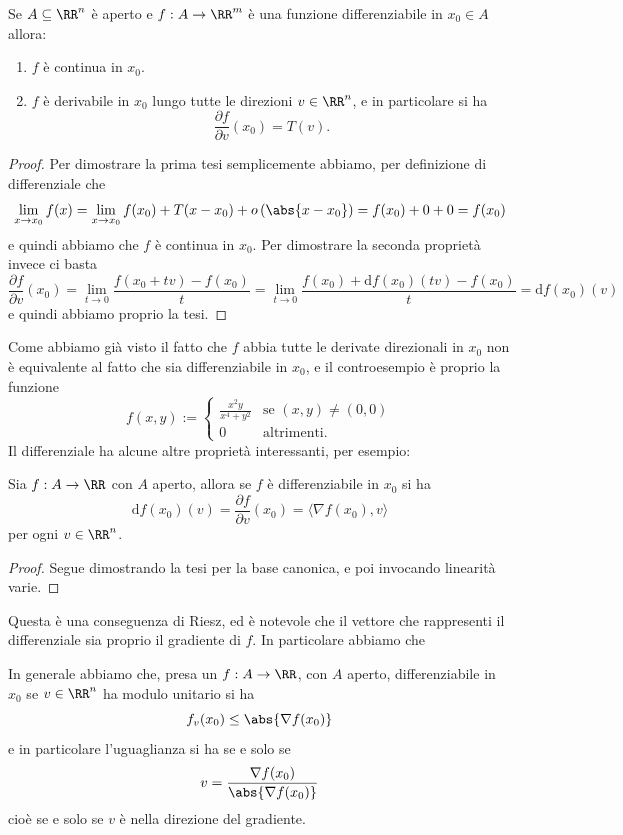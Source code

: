 \documentclass[11pt]{scrartcl}
\newcommand{\dif}{\text{d}}
\begin{document}
	\begin{theorem}
		Se $A\subseteq \RR^n$ è aperto e $f:A\to\RR^m$ è una funzione differenziabile in $x_0\in A$ allora:
		\begin{enumerate}
			\item $f$ è continua in $x_0$.
			\item $f$ è derivabile in $x_0$ lungo tutte le direzioni $v\in\RR^n$, e in particolare si ha
			$$\frac{\partial f}{\partial v}(x_0)=T(v).$$
		\end{enumerate}
	\end{theorem}
	\begin{proof}
		Per dimostrare la prima tesi semplicemente abbiamo, per definizione di differenziale che
		$$\lim_{x\to x_0}f(x)=\lim_{x\to x_0}f(x_0)+T(x-x_0)+o\left(\abs{x-x_0}\right)=f(x_0)+0+0=f(x_0)$$
		e quindi abbiamo che $f$ è continua in $x_0$. Per dimostrare la seconda proprietà invece ci basta
		$$\frac{\partial f}{\partial v}(x_0)=\lim_{t\to 0}\frac{f(x_0+tv)-f(x_0)}{t}=\lim_{t\to 0}\frac{f(x_0)+\dif f(x_0)(tv)-f(x_0)}{t}=\dif f (x_0)(v)$$
		e quindi abbiamo proprio la tesi.
	\end{proof}
	Come abbiamo già visto il fatto che $f$ abbia tutte le derivate direzionali in $x_0$ non è equivalente al fatto che sia differenziabile in $x_0$, e il controesempio è proprio la funzione
	$$f(x,y):=
	\begin{cases}
		\frac{x^2y}{x^4+y^2} & \text{se $(x,y)\ne (0,0)$} \\
		0 & \text{altrimenti.}
	\end{cases}
	$$
	Il differenziale ha alcune altre proprietà interessanti, per esempio:
	\begin{proposition}
		Sia $f:A\to\RR$ con $A$ aperto, allora se $f$ è differenziabile in $x_0$ si ha
		$$\dif f(x_0)(v)=\frac{\partial f}{\partial v}(x_0)=\langle \nabla f(x_0),v\rangle$$
		per ogni $v\in\RR^n$.
	\end{proposition}
	\begin{proof}
		Segue dimostrando la tesi per la base canonica, e poi invocando linearità varie.
	\end{proof}
	Questa è una conseguenza di Riesz, ed è notevole che il vettore che rappresenti il differenziale sia proprio il gradiente di $f$. In particolare abbiamo che
	\begin{proposition}
		In generale abbiamo che, presa un $f:A\to\RR$, con $A$ aperto, differenziabile in $x_0$ se $v\in \RR^n$ ha modulo unitario si ha
		$$f_v(x_0)\le \abs{\nabla f(x_0)}$$
		e in particolare l'uguaglianza si ha se e solo se 
		$$v=\frac{\nabla f (x_0)}{\abs{\nabla f(x_0)}}$$
		cioè se e solo se $v$ è nella direzione del gradiente.
	\end{proposition}
\end{document}
